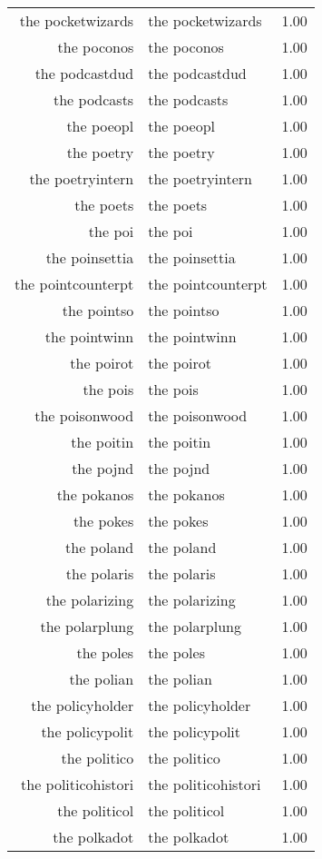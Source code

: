 \begin{table}[ht]
\begin{tabular}{rlr}
  the pocketwizards & the pocketwizards & 1.00 \\ 
  the poconos & the poconos & 1.00 \\ 
  the podcastdud & the podcastdud & 1.00 \\ 
  the podcasts & the podcasts & 1.00 \\ 
  the poeopl & the poeopl & 1.00 \\ 
  the poetry & the poetry & 1.00 \\ 
  the poetryintern & the poetryintern & 1.00 \\ 
  the poets & the poets & 1.00 \\ 
  the poi & the poi & 1.00 \\ 
  the poinsettia & the poinsettia & 1.00 \\ 
  the pointcounterpt & the pointcounterpt & 1.00 \\ 
  the pointso & the pointso & 1.00 \\ 
  the pointwinn & the pointwinn & 1.00 \\ 
  the poirot & the poirot & 1.00 \\ 
  the pois & the pois & 1.00 \\ 
  the poisonwood & the poisonwood & 1.00 \\ 
  the poitin & the poitin & 1.00 \\ 
  the pojnd & the pojnd & 1.00 \\ 
  the pokanos & the pokanos & 1.00 \\ 
  the pokes & the pokes & 1.00 \\ 
  the poland & the poland & 1.00 \\ 
  the polaris & the polaris & 1.00 \\ 
  the polarizing & the polarizing & 1.00 \\ 
  the polarplung & the polarplung & 1.00 \\ 
  the poles & the poles & 1.00 \\ 
  the polian & the polian & 1.00 \\ 
  the policyholder & the policyholder & 1.00 \\ 
  the policypolit & the policypolit & 1.00 \\ 
  the politico & the politico & 1.00 \\ 
  the politicohistori & the politicohistori & 1.00 \\ 
  the politicol & the politicol & 1.00 \\ 
  the polkadot & the polkadot & 1.00 \\ 

\end{tabular}
\end{table}
